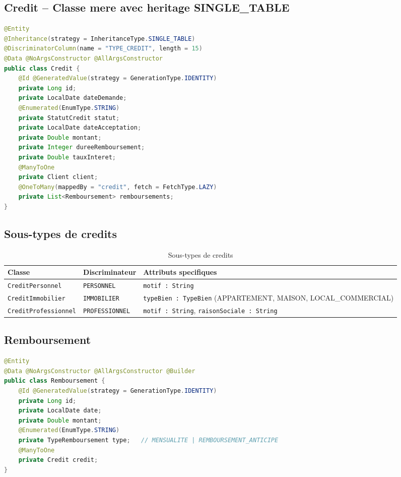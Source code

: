 \documentclass[12pt,a4paper]{report}
\begin{document}
\subsection{Credit -- Classe mere avec heritage SINGLE\_TABLE}

\begin{lstlisting}[language=Java, caption={Entite Credit -- heritage SINGLE\_TABLE}]
@Entity
@Inheritance(strategy = InheritanceType.SINGLE_TABLE)
@DiscriminatorColumn(name = "TYPE_CREDIT", length = 15)
@Data @NoArgsConstructor @AllArgsConstructor
public class Credit {
    @Id @GeneratedValue(strategy = GenerationType.IDENTITY)
    private Long id;
    private LocalDate dateDemande;
    @Enumerated(EnumType.STRING)
    private StatutCredit statut;
    private LocalDate dateAcceptation;
    private Double montant;
    private Integer dureeRemboursement;
    private Double tauxInteret;
    @ManyToOne
    private Client client;
    @OneToMany(mappedBy = "credit", fetch = FetchType.LAZY)
    private List<Remboursement> remboursements;
}
\end{lstlisting}

\subsection{Sous-types de credits}

\begin{table}[h!]
\centering
\begin{tabularx}{\linewidth}{l l X}
\toprule
\textbf{Classe} & \textbf{Discriminateur} & \textbf{Attributs specifiques} \\
\midrule
\texttt{CreditPersonnel}
    & \texttt{PERSONNEL}
    & \texttt{motif : String} \\
\texttt{CreditImmobilier}
    & \texttt{IMMOBILIER}
    & \texttt{typeBien : TypeBien}
      (APPARTEMENT, MAISON, LOCAL\_COMMERCIAL) \\
\texttt{CreditProfessionnel}
    & \texttt{PROFESSIONNEL}
    & \texttt{motif : String}, \texttt{raisonSociale : String} \\
\bottomrule
\end{tabularx}
\caption{Sous-types de credits}
\end{table}

\subsection{Remboursement}

\begin{lstlisting}[language=Java, caption={Entite Remboursement}]
@Entity
@Data @NoArgsConstructor @AllArgsConstructor @Builder
public class Remboursement {
    @Id @GeneratedValue(strategy = GenerationType.IDENTITY)
    private Long id;
    private LocalDate date;
    private Double montant;
    @Enumerated(EnumType.STRING)
    private TypeRemboursement type;   // MENSUALITE | REMBOURSEMENT_ANTICIPE
    @ManyToOne
    private Credit credit;
}
\end{lstlisting}
\end{document}
